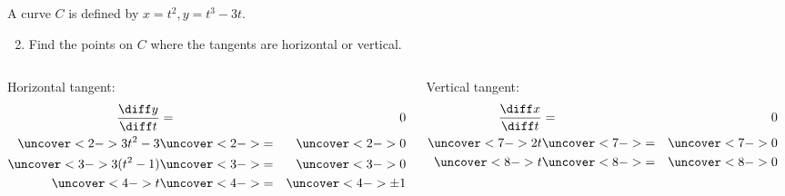 \begin{frame}[t]
\begin{example}[Example 1, p. 667]
A curve $C$ is defined by $x = t^2, y = t^3 - 3t$.
\begin{enumerate}
\setcounter{enumi}{1}
\item  Find the points on $C$ where the tangents are horizontal or vertical.
\end{enumerate}
\begin{columns}[t]
Horizontal tangent:
\abovedisplayskip=0pt
\belowdisplayskip=0pt
\begin{eqnarray*}
\frac{\diff y}{\diff t} & = & 0\\
\uncover<2->{%
3t^2 - 3%
}%
& \uncover<2->{ = } & %
\uncover<2->{%
0
}\\%
\uncover<3->{%
3(t^2 - 1)%
}%
& \uncover<3->{ = } & %
\uncover<3->{%
0
}\\%
\uncover<4->{%
t%
}%
& \uncover<4->{ = } & %
\uncover<4->{%
\pm 1%
}%
\end{eqnarray*}

%
Vertical tangent:
\abovedisplayskip=0pt
\belowdisplayskip=0pt
\begin{eqnarray*}
\frac{\diff x}{\diff t} & = & 0\\
\uncover<7->{%
2t%
}%
& \uncover<7->{ = } & %
\uncover<7->{%
0%
}\\%
\uncover<8->{%
t%
}%
& \uncover<8->{ = } & %
\uncover<8->{%
0%
}%
\end{eqnarray*}

%
\end{columns}
\end{example}
\end{frame}



